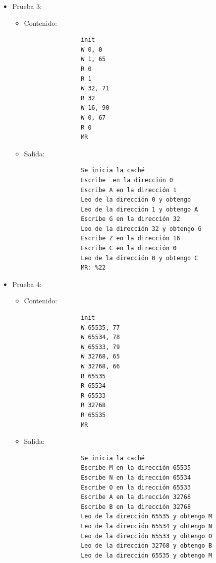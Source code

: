 \documentclass[titlepage,a4paper]{article}
\begin{document}
\begin{itemize}
    \item Prueba 3:
    \begin{itemize}
        \item Contenido:
            \begin{verbatim}
                init
                W 0, 0
                W 1, 65
                R 0
                R 1
                W 32, 71
                R 32
                W 16, 90
                W 0, 67
                R 0
                MR
            \end{verbatim}
        \item Salida:
            \begin{verbatim}
                Se inicia la caché
                Escribe  en la dirección 0
                Escribe A en la dirección 1
                Leo de la dirección 0 y obtengo 
                Leo de la dirección 1 y obtengo A
                Escribe G en la dirección 32
                Leo de la dirección 32 y obtengo G
                Escribe Z en la dirección 16
                Escribe C en la dirección 0
                Leo de la dirección 0 y obtengo C
                MR: %22
            \end{verbatim}
    \end{itemize}
    \item Prueba 4:
    \begin{itemize}
        \item Contenido:
            \begin{verbatim}
                init
                W 65535, 77
                W 65534, 78
                W 65533, 79
                W 32768, 65
                W 32768, 66
                R 65535
                R 65534
                R 65533
                R 32768
                R 65535
                MR
            \end{verbatim}
        \item Salida:
            \begin{verbatim}
                Se inicia la caché
                Escribe M en la dirección 65535
                Escribe N en la dirección 65534
                Escribe O en la dirección 65533
                Escribe A en la dirección 32768
                Escribe B en la dirección 32768
                Leo de la dirección 65535 y obtengo M
                Leo de la dirección 65534 y obtengo N
                Leo de la dirección 65533 y obtengo O
                Leo de la dirección 32768 y obtengo B
                Leo de la dirección 65535 y obtengo M

\end{verbatim}
\end{itemize}
\end{itemize}
\end{document}
